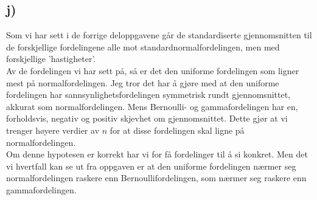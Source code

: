 \documentclass[a4paper,norsk, 10pt]{article}
\begin{document}
\subsection*{j)}

Som vi har sett i de forrige deloppgavene går de standardiserte gjennomsnitten til de forskjellige fordelingene alle mot standardnormalfordelingen, men med forskjellige 'hastigheter'.\\

Av de fordelingen vi har sett på, så er det den uniforme fordelingen som ligner mest på normalfordelingen. Jeg tror det har å gjøre med at den uniforme fordelingen har sannsynlighetsfordelingen symmetrisk rundt gjennomsnittet, akkurat som normalfordelingen. Mens Bernoulli- og gammafordelingen har en, forholdsvis, negativ og positiv skjevhet om gjennomsnittet. Dette gjør at vi trenger høyere verdier av $n$ for at disse fordelingen skal ligne på normalfordelingen. \\

Om denne hypotesen er korrekt har vi for få fordelinger til å si konkret. Men det vi hvertfall kan se ut fra oppgaven er at den uniforme fordelingen nærmer seg normalfordelingen raskere enn Bernoullifordelingen, som nærmer seg raskere enn gammafordelingen.
\end{document}
